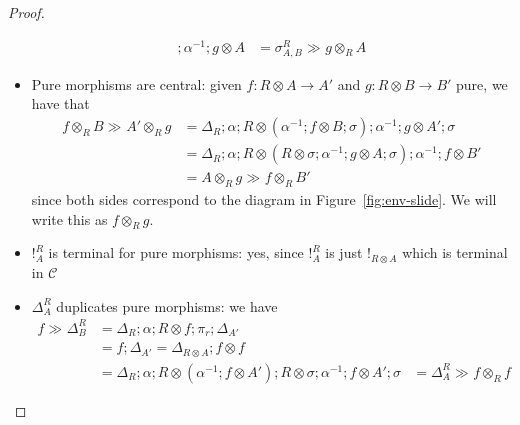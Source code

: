 \documentclass[acmsmall,screen,review]{acmart}
\newcommand{\mc}[1]{\ensuremath{\mathcal{#1}}}
\newcommand{\dmor}[1]{{\Delta}_{#1}}
\newcommand{\rseq}[3]{#2 \gg_{#1} #3}
\begin{document}
\begin{proof}
\begin{itemize}
\begin{equation}
\begin{aligned}
          ; \alpha^{-1} ; g \otimes A
        &= \rseq{}{\sigma^R_{A, B}}{g \otimes_R A}
      \end{aligned}
    \end{equation}
    \item Pure morphisms are central: given $f : R \otimes A \to A'$ and $g : R \otimes B \to B'$
    pure, we have that
    \begin{equation}
      \begin{aligned}
      \rseq{}{f \otimes_R B}{A' \otimes_R g}
      & = \Delta_R ; \alpha ; R \otimes (\alpha^{-1} ; f \otimes B ; \sigma) 
        ; \alpha^{-1} ; g \otimes A' ; \sigma \\
      & = \Delta_R ; \alpha ; R \otimes (R \otimes \sigma ; \alpha^{-1} ; g \otimes A ; \sigma) 
      ; \alpha^{-1} ; f \otimes B' \\
      & = \rseq{}{A \otimes_R g}{f \otimes_R B'}
      \end{aligned}
    \end{equation}
    since both sides correspond to the diagram in Figure~\ref{fig:env-slide}. We will write this as $f
    \otimes_R g$.
    \item $!^R_A$ is terminal for pure morphisms: yes, since $!^R_A$ is just $!_{R \otimes A}$ which
    is terminal in $\mc{C}$
    \item $\Delta^R_A$ duplicates pure morphisms: we have
    \begin{equation}
      \begin{aligned}
      \rseq{}{f}{\Delta^R_B} 
        & = \dmor{R} ; \alpha ; R \otimes f ; \pi_r ; \dmor{A'} \\
        & = f ; \dmor{A'} = \dmor{R \otimes A} ; f \otimes f \\
        & = \dmor{R} ; \alpha ; R \otimes (\alpha^{-1} ; f \otimes A') 
          ; R \otimes \sigma ; \alpha^{-1} ; f \otimes A' ; \sigma
        & = \rseq{}{\Delta^R_A}{f \otimes_R f}
      \end{aligned}
    \end{equation}
  \end{itemize}
\end{proof}
\end{document}
